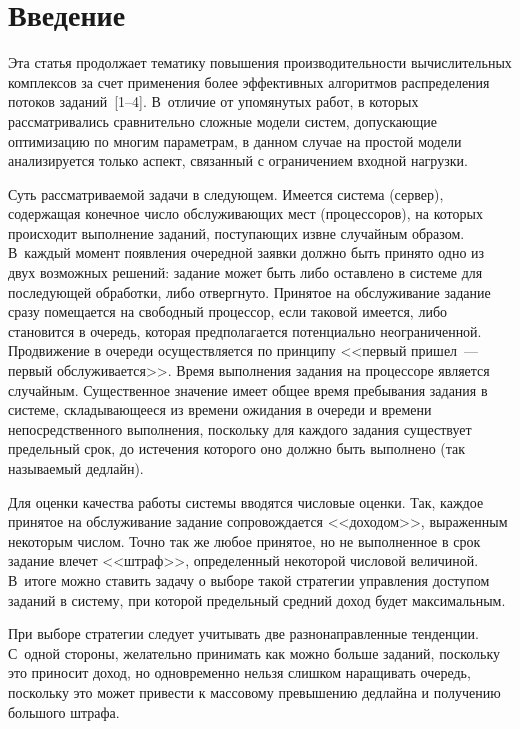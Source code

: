       \begin{multicols}{2}

            \label{st\stat}

\section{Введение}

     Эта статья продолжает тематику повышения производительности вычислительных 
комплексов за счет применения более эффективных алгоритмов распределения потоков 
заданий~[1--4]. В~отли\-чие от упомянутых работ, в которых рассматривались 
сравнительно сложные модели систем, допуска\-ющие оптимизацию по многим 
параметрам, в данном случае на простой модели анализируется только аспект, связанный 
с ограничением входной нагруз\-ки.
     
     Суть рассматриваемой задачи в следующем. Имеется система (сервер), содержащая 
конечное число обслуживающих мест (процессоров), на которых происходит выполнение 
заданий, поступа\-ющих извне случайным образом. В~каждый момент появления 
очередной заявки должно быть принято одно из двух возможных решений: задание может 
быть либо оставлено в системе для последующей обработки, либо отвергнуто. Принятое 
на обслуживание задание сразу помещается на свободный процессор, если таковой 
имеется, либо становится в очередь, которая предполагается потенциально 
неограниченной. Продвижение в очереди осуществляется по принципу <<первый 
пришел~--- первый обслуживается>>. Время выполнения задания на процессоре является 
случайным. Существенное значение имеет общее время пребывания задания в системе, 
складывающееся из времени ожидания в очереди и времени непосредственного 
выполнения, поскольку для каждого задания существует предельный срок, до истечения 
которого оно должно быть выполнено (так называемый дедлайн).
     
     Для оценки качества работы системы вводятся числовые оценки. Так, каждое 
принятое на обслуживание задание сопровождается <<доходом>>, выраженным 
некоторым числом. Точно так же любое принятое, но не выполненное в срок задание 
влечет <<штраф>>, определенный некоторой числовой величиной. В~итоге можно 
ставить задачу о выборе такой стратегии управления доступом заданий в систему, при 
которой предельный средний доход будет максимальным. 

При выборе стратегии следует 
учитывать две разнонаправленные тенденции. С~одной стороны, желательно принимать 
как можно больше заданий, поскольку это приносит доход, но одновременно нельзя 
слишком наращивать очередь, поскольку это может привести к массовому превышению 
дедлайна и получению большого штрафа.
     

\end{multicols}
